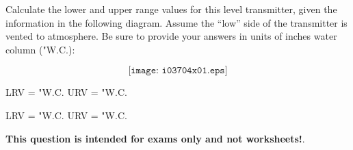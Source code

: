 

Calculate the lower and upper range values for this level transmitter, given the information in the following diagram.  Assume the ``low'' side of the transmitter is vented to atmosphere.  Be sure to provide your answers in units of inches water column ("W.C.):

$$\texttt{[image: i03704x01.eps]}$$

LRV = \underbar{\hskip 50pt} "W.C. \hskip 100pt URV = \underbar{\hskip 50pt} "W.C.







LRV =  "W.C. \hskip 100pt URV =  "W.C.







{\bf This question is intended for exams only and not worksheets!}.



